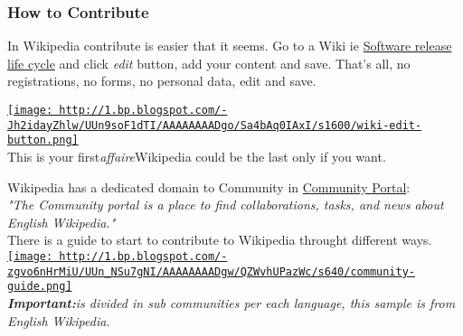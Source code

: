 \subsubsection{ How to Contribute} In Wikipedia contribute is easier that it seems. Go to a Wiki ie \href{http://en.wikipedia.org/wiki/Software_release_life_cycle}{Software release life cycle} and click \textit{edit} button, add your content and save. That's all, no registrations, no forms, no personal data, edit and save.
\begin{tabular}\href{http://1.bp.blogspot.com/-Jh2idayZhlw/UUn9soF1dTI/AAAAAAAADgo/Sa4bAq0IAxI/s1600/wiki-edit-button.png}{
\texttt{[image: http://1.bp.blogspot.com/-Jh2idayZhlw/UUn9soF1dTI/AAAAAAAADgo/Sa4bAq0IAxI/s1600/wiki-edit-button.png]}} \\ 
This is your first\nolinebreak\textit{affaire}\nolinebreakwith Wikipedia could be the last only if you want.
\end{tabular} Wikipedia has a dedicated domain to Community in \href{http://en.wikipedia.org/wiki/Wikipedia:Community_portal}{Community Portal}:\textit{
\\}\textit{"The Community portal is a place to find collaborations, tasks, and news about English Wikipedia."}
\\ There is a guide to start to contribute to Wikipedia throught different ways.
\\\href{http://1.bp.blogspot.com/-zgvo6nHrMiU/UUn_NSu7gNI/AAAAAAAADgw/QZWvhUPazWc/s1600/community-guide.png}{
\texttt{[image: http://1.bp.blogspot.com/-zgvo6nHrMiU/UUn\_NSu7gNI/AAAAAAAADgw/QZWvhUPazWc/s640/community-guide.png]}}
\\\textit{\textbf{Important:}\nolinebreakWikipedia is divided in sub communities per each language, this sample is from English Wikipedia.}\textit{
\\}
